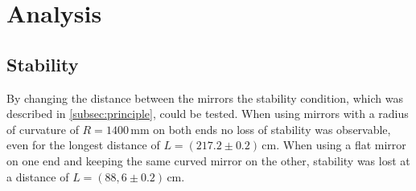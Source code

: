 \section{Analysis} %
\label{sec:analysis}

\subsection{Stability}
By changing the distance between the mirrors the stability condition, 
which was described in \autoref{subsec:principle}, could be tested.
When using mirrors with a radius of curvature of $R=1400\,\unit{\mm}$ on both ends no loss of stability was observable, even for the 
longest distance of $L=(217.2\pm0.2)\,\unit{\cm}$. 
When using a flat mirror on one end and keeping the same curved mirror on the other, 
stability was lost at a distance of $L=(88,6\pm0.2)\,\unit{\cm}$.

